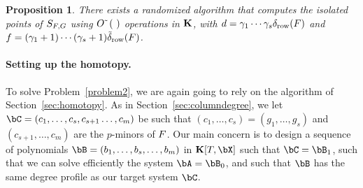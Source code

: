 \documentclass[12pt]{article}
\newtheorem{proposition}[definition]{Proposition}
\begin{document}
\begin{proposition}\label{prop:rowdegree}
  There exists a randomized algorithm that computes the isolated
  points of $S_{{F},G}$ using ${O}{\,\tilde{ }\,}\left (\ \right)$ operations in
  $\mathbf{K}$, with $d=\gamma_1\cdots\gamma_s \delta_{\rm row}({F})$ and
  $f=(\gamma_1+1)\cdots(\gamma_s+1) \tilde\delta_{\rm row}({F})$.
\end{proposition}



\paragraph{Setting up the homotopy.}
To solve Problem~\ref{problem2}, we are again going to rely on the
algorithm of Section~\ref{sec:homotopy}. As in Section~\ref{sec:columndegree},
we let $\bC=(c_1,\dots,c_s,c_{s+1}\dots,c_m)$ be such that
$(c_1,\dots,c_s)=(g_1,\dots,g_s)$ and $(c_{s+1},\dots,c_m)$ are the
$p$-minors of ${F}$. Our main concern is to design a sequence of
polynomials $\bB=(b_1,\dots,b_s,\dots,b_m)$ in $\KK[T,\bX]$ such that
$\bC=\bB_1$, such that we can solve efficiently the system
$\bA=\bB_0$, and such that $\bB$ has the same degree profile as our target system
$\bC$.
\end{document}
